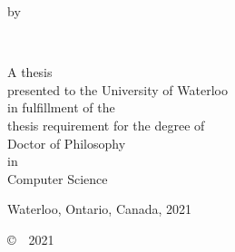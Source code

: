 \thispagestyle{empty}
\begin{center}
	\sffamily
	\vfill
	\Huge
	\thetitle
	
	\vfill
	
	\normalsize
	by \\
	
	\vfill
	
	\Large
	\theauthor \\
	
	\vfill
	\vfill
	\vfill
	
	\normalsize
	A thesis \\
	presented to the University of Waterloo \\ 
	in fulfillment of the \\
	thesis requirement for the degree of \\
	Doctor of Philosophy \\
	in \\
	Computer Science \\
	
	\vfill
	\vfill
	
	Waterloo, Ontario, Canada, 2021 \\
	
	\vfill
	
	\copyright\ \theauthor~2021 \\
\end{center}
\clearpage